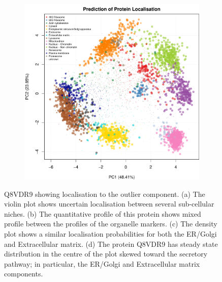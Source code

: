 \documentclass[12pt,english]{article}\usepackage[]{graphicx}\usepackage[]{color}
\makeatletter
\def\maxwidth{ %
  \ifdim\Gin@nat@width>\linewidth
    \linewidth
  \else
    \Gin@nat@width
  \fi
}
\newenvironment{knitrout}{}{} %
\makeatother
\begin{document}
\begin{figure}[h]
\begin{subfigure}[t]{0.5\textwidth}
\begin{knitrout}
{}



\end{knitrout}
    \caption{}
  \end{subfigure}%
  \begin{subfigure}[t]{0.5\textwidth}
    \centering
\begin{knitrout}
\color{fgcolor}

{\centering \includegraphics[width=\maxwidth]{figure/unnamed-chunk-25-1} 

}



\end{knitrout}
    \caption{}
  \end{subfigure}

  \caption{Q8VDR9 showing localisation to the
  outlier component.
  (a) The violin plot shows
    uncertain localisation between several sub-cellular niches. (b) The
    quantitative profile of this protein shows mixed profile between the
    profiles of the organelle markers. (c) The density plot shows a
    similar localisation probabilities for both the ER/Golgi and Extracellular
    matrix. (d) The protein Q8VDR9 has steady state
    distribution in the centre of the plot skewed toward the secretory pathway; in particular,
    the ER/Golgi and Extracellular matrix components.}
  \label{fig:Q8VDR9}
\end{figure}
\end{document}
